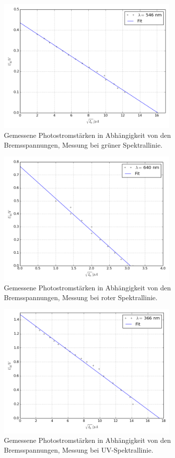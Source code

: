 \begin{figure}[p]
	\centering
	\includegraphics[width=0.8\textwidth]{Bilder/Fit_gruen.png}
	\caption{Gemessene Photostromstärken in Abhängigkeit von den Bremsspannungen, Messung bei grüner Spektrallinie.}
\end{figure}
\begin{figure}[p]
	\centering
	\includegraphics[width=0.8\textwidth]{Bilder/Fit_rot.png}
	\caption{Gemessene Photostromstärken in Abhängigkeit von den Bremsspannungen, Messung bei roter Spektrallinie.}
\end{figure}
\begin{figure}[p]
	\centering
	\includegraphics[width=0.8\textwidth]{Bilder/Fit_uv.png}
	\caption{Gemessene Photostromstärken in Abhängigkeit von den Bremsspannungen, Messung bei UV-Spektrallinie.}
\end{figure}
